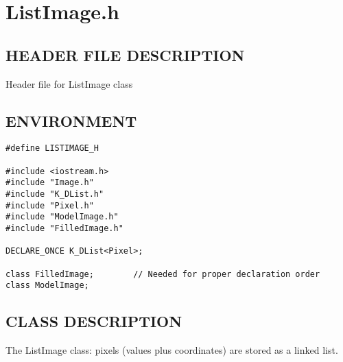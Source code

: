 \clearpage
\section{ListImage.h}

\subsection*{HEADER FILE DESCRIPTION}
 Header file for ListImage class
  
\subsection*{ENVIRONMENT}
\begin{verbatim}
#define LISTIMAGE_H

#include <iostream.h>
#include "Image.h"
#include "K_DList.h"
#include "Pixel.h"
#include "ModelImage.h"
#include "FilledImage.h"

DECLARE_ONCE K_DList<Pixel>;

class FilledImage;        // Needed for proper declaration order
class ModelImage;
\end{verbatim}

\subsection*{CLASS DESCRIPTION}
   The ListImage class: pixels (values plus coordinates) are stored
   as a linked list.

